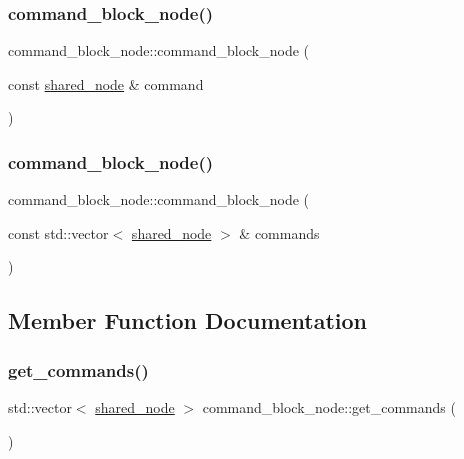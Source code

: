 \subsubsection{\texorpdfstring{command\+\_\+block\+\_\+node()}{command\_block\_node()}\hspace{0.1cm}{\footnotesize\ttfamily [2/3]}}
{\footnotesize\ttfamily command\+\_\+block\+\_\+node\+::command\+\_\+block\+\_\+node (\begin{DoxyParamCaption}\item[{const \hyperlink{namespacejawe_a3f307481d921b6cbb50cc8511fc2b544}{shared\+\_\+node} \&}]{command }\end{DoxyParamCaption})}

\mbox{\label{classjawe_1_1command__block__node_a4cbb669292fd23c022260f0b5ca6e88d}} 
\subsubsection{\texorpdfstring{command\+\_\+block\+\_\+node()}{command\_block\_node()}\hspace{0.1cm}{\footnotesize\ttfamily [3/3]}}
{\footnotesize\ttfamily command\+\_\+block\+\_\+node\+::command\+\_\+block\+\_\+node (\begin{DoxyParamCaption}\item[{const std\+::vector$<$ \hyperlink{namespacejawe_a3f307481d921b6cbb50cc8511fc2b544}{shared\+\_\+node} $>$ \&}]{commands }\end{DoxyParamCaption})}



\subsection{Member Function Documentation}
\mbox{\label{classjawe_1_1command__block__node_ab3c22d98d1174a7f2a3fc35ed1fae74b}} 
\subsubsection{\texorpdfstring{get\+\_\+commands()}{get\_commands()}}
{\footnotesize\ttfamily std\+::vector$<$ \hyperlink{namespacejawe_a3f307481d921b6cbb50cc8511fc2b544}{shared\+\_\+node} $>$ command\+\_\+block\+\_\+node\+::get\+\_\+commands (\begin{DoxyParamCaption}{ }\end{DoxyParamCaption})}

